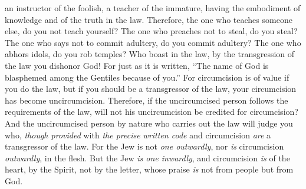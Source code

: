 \begin{biblechapter}
\verse an instructor of the foolish, a teacher of the immature, having the embodiment of knowledge and of the truth in the law.
\verse Therefore, the one who teaches someone else, do you not teach yourself? The one who preaches not to steal, do you steal?
\verse The one who says not to commit adultery, do you commit adultery? The one who abhors idols, do you rob temples?
\verse Who boast in the law, by the transgression of the law you dishonor God!
\verse For just as it is written, “The name of God is blasphemed among the Gentiles because of you.”
\verse For circumcision is of value if you do the law, but if you should be a transgressor of the law, your circumcision has become uncircumcision.
\verse Therefore, if the uncircumcised person follows the requirements of the law, will not his uncircumcision be credited for circumcision?
\verse And the uncircumcised person by nature who carries out the law will judge you who, \textit{though provided} with \textit{the precise written code} and circumcision \textit{are} a transgressor of the law.
\verse For the Jew is not \textit{one outwardly}, nor \textit{is} circumcision \textit{outwardly}, in the flesh.
\verse But the Jew \textit{is one inwardly}, and circumcision \textit{is} of the heart, by the Spirit, not by the letter, whose praise \textit{is} not from people but from God.
\end{biblechapter}

